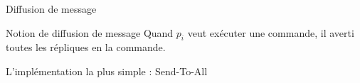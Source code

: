 
\begingroup


\begin{frame}{Diffusion de message}

  \begin{block}{Notion de diffusion de message}
    Quand $p_i$ veut exécuter une commande, il averti toutes les répliques en  la commande.
    \begin{algorithm}[H]
    \end{algorithm}
  \end{block}

  \begin{block}{L'implémentation la plus simple : Send-To-All}
    \begin{algorithm}[H]
    \end{algorithm}
  \end{block}
  
\end{frame}

\endgroup
\endinput
